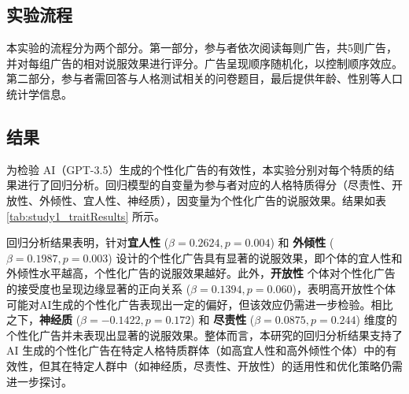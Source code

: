 \subsection{实验流程}
本实验的流程分为两个部分。第一部分，参与者依次阅读每则广告，共5则广告，并对每组广告的相对说服效果进行评分。广告呈现顺序随机化，以控制顺序效应。第二部分，参与者需回答与人格测试相关的问卷题目，最后提供年龄、性别等人口统计学信息。

\subsection{结果}
为检验 AI（GPT-3.5）生成的个性化广告的有效性，本实验分别对每个特质的结果进行了回归分析。回归模型的自变量为参与者对应的人格特质得分（尽责性、开放性、外倾性、宜人性、神经质），因变量为个性化广告的说服效果。结果如表 \ref{tab:study1_traitResults} 所示。

回归分析结果表明，针对\textbf{宜人性} ($\beta = 0.2624, \textit{p} = 0.004$) 和 \textbf{外倾性} ($\beta = 0.1987, \textit{p} = 0.003$) 设计的个性化广告具有显著的说服效果，即个体的宜人性和外倾性水平越高，个性化广告的说服效果越好。此外，\textbf{开放性} 个体对个性化广告的接受度也呈现边缘显著的正向关系 ($\beta = 0.1394, \textit{p} = 0.060$)，表明高开放性个体可能对AI生成的个性化广告表现出一定的偏好，但该效应仍需进一步检验。相比之下，\textbf{神经质} ($\beta = -0.1422, \textit{p} = 0.172$) 和 \textbf{尽责性} ($\beta = 0.0875, \textit{p} = 0.244$) 维度的个性化广告并未表现出显著的说服效果。整体而言，本研究的回归分析结果支持了 AI 生成的个性化广告在特定人格特质群体（如高宜人性和高外倾性个体）中的有效性，但其在特定人群中（如神经质，尽责性、开放性）的适用性和优化策略仍需进一步探讨。

